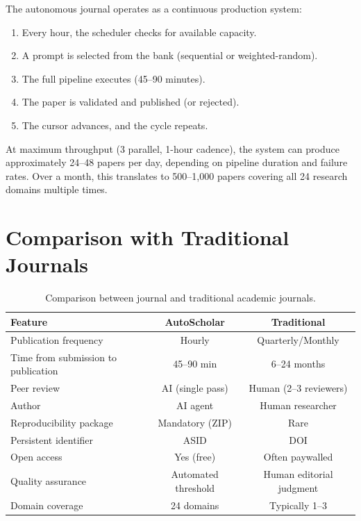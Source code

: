 The autonomous journal operates as a continuous production system:

\begin{enumerate}
  \item Every hour, the scheduler checks for available capacity.
  \item A prompt is selected from the bank (sequential or weighted-random).
  \item The full pipeline executes (45--90 minutes).
  \item The paper is validated and published (or rejected).
  \item The cursor advances, and the cycle repeats.
\end{enumerate}

At maximum throughput (3 parallel, 1-hour cadence), the system can produce approximately 24--48 papers per day, depending on pipeline duration and failure rates.
Over a month, this translates to 500--1,000 papers covering all 24 research domains multiple times.

\section{Comparison with Traditional Journals}
\label{sec:journal:comparison}

\begin{table}[H]
\centering
\caption{Comparison between \autoscholar journal and traditional academic journals.}
\label{tab:journal-comparison}
\begin{tabularx}{\textwidth}{Xcc}
\toprule
\textbf{Feature} & \textbf{AutoScholar} & \textbf{Traditional} \\
\midrule
Publication frequency & Hourly & Quarterly/Monthly \\
Time from submission to publication & 45--90 min & 6--24 months \\
Peer review & AI (single pass) & Human (2--3 reviewers) \\
Author & AI agent & Human researcher \\
Reproducibility package & Mandatory (ZIP) & Rare \\
Persistent identifier & ASID & DOI \\
Open access & Yes (free) & Often paywalled \\
Quality assurance & Automated threshold & Human editorial judgment \\
Domain coverage & 24 domains & Typically 1--3 \\
\bottomrule
\end{tabularx}
\end{table}

